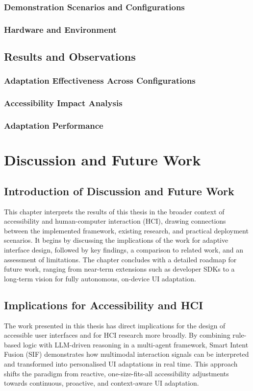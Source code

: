 \documentclass[openany]{book}
\begin{document}
    \subsection{Demonstration Scenarios and Configurations}
    \subsection{Hardware and Environment}
\section{Results and Observations}
    \subsection{Adaptation Effectiveness Across Configurations}
    \subsection{Accessibility Impact Analysis}
    \subsection{Adaptation Performance}


\chapter{Discussion and Future Work}

\section{Introduction of Discussion and Future Work}
This chapter interprets the results of this thesis in the broader context of accessibility and human-computer interaction (HCI), drawing connections between the implemented framework, existing research, and practical deployment scenarios. It begins by discussing the implications of the work for adaptive interface design, followed by key findings, a comparison to related work, and an assessment of limitations. The chapter concludes with a detailed roadmap for future work, ranging from near-term extensions such as developer SDKs to a long-term vision for fully autonomous, on-device UI adaptation.

\section{Implications for Accessibility and HCI}
The work presented in this thesis has direct implications for the design of accessible user interfaces and for HCI research more broadly. By combining rule-based logic with LLM-driven reasoning in a multi-agent framework, Smart Intent Fusion (SIF) demonstrates how multimodal interaction signals can be interpreted and transformed into personalised UI adaptations in real time. This approach shifts the paradigm from reactive, one-size-fits-all accessibility adjustments towards continuous, proactive, and context-aware UI adaptation.
\end{document}
